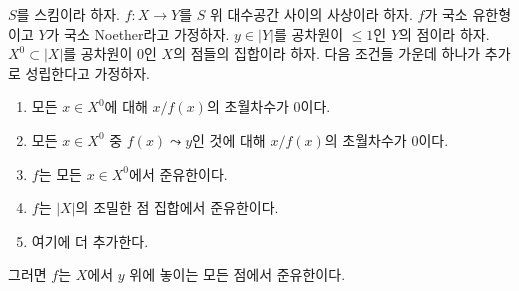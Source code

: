 \begin{lemma}
\label{lemma-quasi-finite-in-codim-1}
$S$를 스킴이라 하자. $f : X \to Y$를 $S$ 위 대수공간 사이의 사상이라
하자. $f$가 국소 유한형이고 $Y$가 국소 Noether라고 가정하자.
$y \in |Y|$를 공차원이 $\leq 1$인 $Y$의 점이라 하자.
$X^0 \subset |X|$를 공차원이 $0$인 $X$의 점들의 집합이라 하자.
다음 조건들 가운데 하나가 추가로 성립한다고 가정하자.
\begin{enumerate}
\item 모든 $x \in X^0$에 대해 $x/f(x)$의 초월차수가 $0$이다.
\item 모든 $x \in X^0$ 중 $f(x) \leadsto y$인 것에 대해
$x/f(x)$의 초월차수가 $0$이다.
\item $f$는 모든 $x \in X^0$에서 준유한이다.
\item $f$는 $|X|$의 조밀한 점 집합에서 준유한이다.
\item 여기에 더 추가한다.
\end{enumerate}
그러면 $f$는 $X$에서 $y$ 위에 놓이는 모든 점에서 준유한이다.
\end{lemma}


